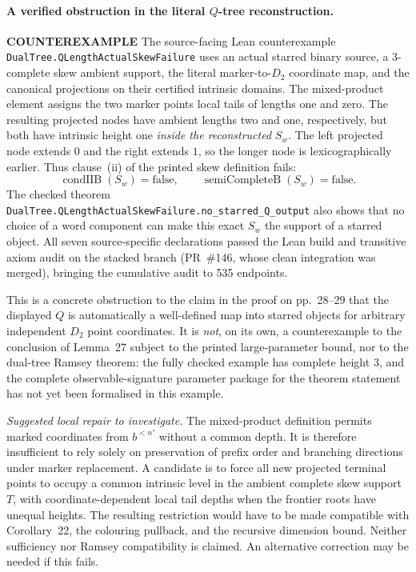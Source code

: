 \documentclass[11pt]{article}
\newcommand{\bad}{\textcolor{red!70!black}{\textbf{COUNTEREXAMPLE}}}
\newcommand{\lean}[1]{\texttt{#1}}
\begin{document}
\paragraph{A verified obstruction in the literal $Q$-tree reconstruction.} \bad
The source-facing Lean counterexample
\lean{DualTree.QLengthActualSkewFailure}
uses an actual starred binary source, a $3$-complete skew ambient
support, the literal marker-to-$D_2$ coordinate map, and the
canonical projections on their certified intrinsic domains.
The mixed-product element assigns the two marker points local
tails of lengths one and zero.  The resulting projected nodes
have ambient lengths two and one, respectively, but both have
intrinsic height one \emph{inside the reconstructed} $S_w$.
The left projected node extends $0$ and the right extends $1$,
so the longer node is lexicographically earlier. Thus clause~(ii)
of the printed skew definition fails:
\[
  \operatorname{condIIB}(S_w)=\mathrm{false},\qquad
  \operatorname{semiCompleteB}(S_w)=\mathrm{false}.
\]
The checked theorem
\lean{DualTree.QLengthActualSkewFailure.no_starred_Q_output}
also shows that no choice of a word component can make this exact
$S_w$ the support of a starred object.
All seven source-specific declarations passed the Lean build and
transitive axiom audit on the stacked branch (PR~\#146, whose
clean integration was merged), bringing the cumulative audit to
535 endpoints.

This is a concrete obstruction to the claim in the proof on
pp.~28--29 that the displayed $Q$ is automatically a
well-defined map into starred objects for arbitrary independent
$D_2$ point coordinates. It is \emph{not}, on its own, a
counterexample to the conclusion of Lemma~27 subject to the
printed large-parameter bound, nor to the dual-tree Ramsey
theorem: the fully checked example has complete height $3$,
and the complete observable-signature parameter package for
the theorem statement has not yet been formalised in this example.

\emph{Suggested local repair to investigate.}
The mixed-product definition permits marked coordinates from
$b^{<n'}$ without a common depth. It is therefore insufficient
to rely solely on preservation of prefix order and branching
directions under marker replacement. A candidate is to force
all new projected terminal points to occupy a common intrinsic
level in the ambient complete skew support $T$, with
coordinate-dependent local tail depths when the frontier roots
have unequal heights. The resulting restriction would have to
be made compatible with Corollary~22, the colouring pullback,
and the recursive dimension bound. Neither sufficiency nor
Ramsey compatibility is claimed. An alternative correction
may be needed if this fails.
\end{document}
